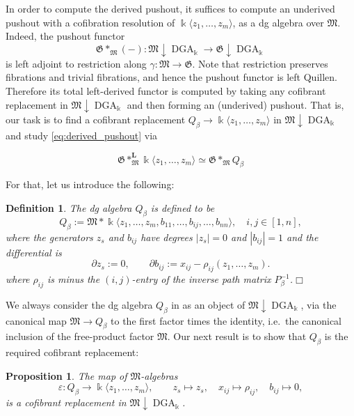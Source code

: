 \documentclass[11pt]{article}
\newtheorem{proposition}[theorem]{Proposition}
\newtheorem{definition}[theorem]{Definition}
\newcommand{\kk}{\Bbbk}
\newcommand{\FM}{\mathfrak M}
\newcommand{\FG}{\mathfrak G}
\newcommand{\lr}{\longrightarrow}
\newcommand{\DGA}{\operatorname{DGA}_{\kk}}
\begin{document}
In order to compute the derived pushout, it suffices to compute an underived pushout with a cofibration resolution of $\kk\langle z_1,\ldots,z_m\rangle$, as a dg algebra over $\FM$. Indeed, the pushout functor
\[
 \FG*_{\FM}(-):\FM\!\downarrow\!\DGA
 \longrightarrow \FG\!\downarrow\!\DGA
\]
is left adjoint to restriction along \(\gamma:\FM\to\FG\). Note that restriction preserves fibrations and trivial fibrations, and hence the pushout functor is left
Quillen. Therefore its total left-derived functor is computed by taking
any cofibrant replacement in \(\FM\!\downarrow\!\DGA\) and then forming
an (underived) pushout. That is, our task is to find a cofibrant replacement $Q_\beta\lr \kk\langle z_1,\ldots,z_m\rangle$ in \(\FM\!\downarrow\!\DGA\) and study \eqref{eq:derived_pushout} via

\begin{equation}\label{eq:derived_pushout2}
\FG*^{\mathbf L}_{\FM}\kk\langle z_1,\ldots,z_m\rangle\simeq\FG*_{\FM}Q_\beta
\end{equation}

For that, let us introduce the following:

\begin{definition}\label{def:cofibrant_replacement}
The dg algebra $Q_\beta$ is defined to be
\[
 Q_\beta:=\FM*\kk\langle z_1,\ldots,z_m,b_{11},\ldots,b_{ij},\ldots,b_{nn}\rangle,\quad i,j\in[1,n],
\]
where the generators $z_s$ and $b_{ij}$ have degrees $|z_s|=0$ and $|b_{ij}|=1$ and the differential is 
\[
 \partial z_s:=0,
 \qquad
 \partial b_{ij}:=x_{ij}-\rho_{ij}(z_1,\ldots,z_m).
\]
where $\rho_{ij}$ is minus the $(i,j)$-entry of the inverse path matrix $P_{\beta}^{-1}$.\hfill$\Box$
\end{definition}

\noindent We always consider the dg algebra $Q_\beta$ in  as an object of \(\FM\!\downarrow\!\DGA\), via the canonical map $\FM\lr Q_\beta$ to the first factor times the identity, i.e.~the canonical inclusion of the free-product factor $\FM$. Our next result is to show that $Q_\beta$ is the required cofibrant replacement:


\begin{proposition}
\label{lem:relative-resolution} The map of \(\FM\)-algebras
\[
 \varepsilon:Q_\beta\longrightarrow \kk\langle z_1,\ldots,z_m\rangle,
 \qquad
 z_s\longmapsto z_s,
 \quad x_{ij}\longmapsto \rho_{ij},
 \quad b_{ij}\longmapsto0,
\]
is a cofibrant replacement in
\(\FM\!\downarrow\!\DGA\).
\end{proposition}
\end{document}

